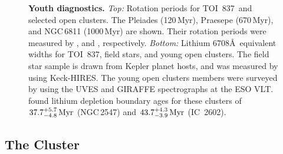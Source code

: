 \documentclass[12pt,twocolumn,tighten]{aastex63}
\newcommand{\tn}{TOI~837} %
\newcommand{\cn}{IC~2602} %
\begin{document}
\begin{figure}[!t]
	\begin{center}
		\leavevmode
		
		\vspace{-0.5cm}
	\end{center}
	\vspace{-0.7cm}
	\caption{ {\bf Youth diagnostics.}
  {\it Top:} Rotation periods for \tn\ and selected open clusters.
  The Pleiades (120$\,$Myr), Praesepe (670$\,$Myr), and NGC$\,$6811
  (1000$\,$Myr) are shown.  Their rotation periods were measured by
  \citet{rebull_rotation_2016a,douglas_poking_2017,douglas_k2_2019},
  and \citet{curtis_temporary_2019}, respectively.  {\it Bottom:}
  Lithium 6708\AA\ equivalent widths for \tn, field stars, and young
  open clusters.  The field star sample is drawn from Kepler planet
  hosts, and was measured by \citet{berger_identifying_2018} using
  Keck-HIRES.  The young open clusters members were surveyed by
  \citet{randich_gaiaeso_2018} using the UVES and GIRAFFE
  spectrographs at the ESO VLT.  \citet{randich_gaiaeso_2018} found
  lithium depletion boundary ages for these clusters of
  $37.7^{+5.7}_{-4.8}\,{\rm Myr}$ (NGC$\,$2547) and
  $43.7^{+4.3}_{-3.9}\,{\rm Myr}$ (\cn).  
    \label{fig:lithium_rotation}
	}
\end{figure}




\subsection{The Cluster}
\label{subsec:cluster}
\end{document}
